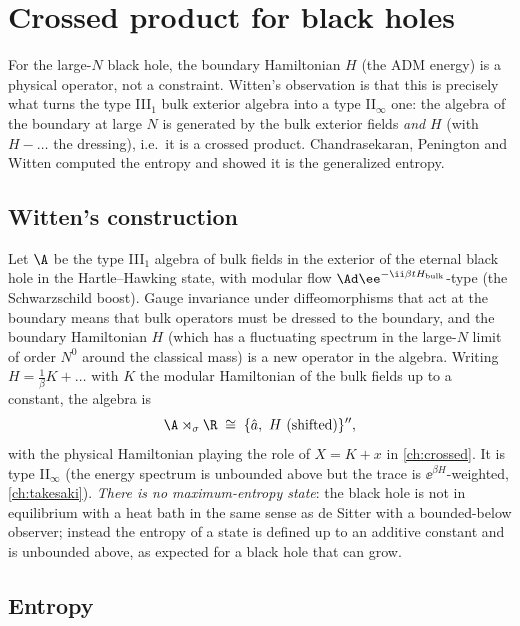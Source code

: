 \chapter{Crossed product for black holes}\label{ch:bh_crossed}
\skippable

\begin{physmotiv}
For the large-$N$ black hole, the boundary Hamiltonian $H$ (the ADM energy) is a physical operator, not a constraint. Witten's observation is that this is precisely what turns the type III$_1$ bulk exterior algebra into a type II$_\infty$ one: the algebra of the boundary at large $N$ is generated by the bulk exterior fields \emph{and} $H$ (with $H-\ldots$ the dressing), i.e.\ it is a crossed product. Chandrasekaran, Penington and Witten computed the entropy and showed it is the generalized entropy.
\end{physmotiv}

\section{Witten's construction}

Let $\A$ be the type III$_1$ algebra of bulk fields in the exterior of the eternal black hole in the Hartle--Hawking state, with modular flow $\Ad\ee^{-\ii\beta tH_{\rm bulk}}$-type (the Schwarzschild boost). Gauge invariance under diffeomorphisms that act at the boundary means that bulk operators must be dressed to the boundary, and the boundary Hamiltonian $H$ (which has a fluctuating spectrum in the large-$N$ limit of order $N^0$ around the classical mass) is a new operator in the algebra. Writing $H=\frac{1}{\beta}K+\ldots$ with $K$ the modular Hamiltonian of the bulk fields up to a constant, the algebra is
\begin{equation}
\A\rtimes_\sigma\R\;\cong\;\{\hat a,\ H\ \text{(shifted)}\}'',
\end{equation}
with the physical Hamiltonian playing the role of $X=K+x$ in \cref{ch:crossed}. It is type II$_\infty$ (the energy spectrum is unbounded above but the trace is $\ee^{\beta H}$-weighted, \cref{ch:takesaki}). \emph{There is no maximum-entropy state}: the black hole is not in equilibrium with a heat bath in the same sense as de Sitter with a bounded-below observer; instead the entropy of a state is defined up to an additive constant and is unbounded above, as expected for a black hole that can grow.

\section{Entropy}


